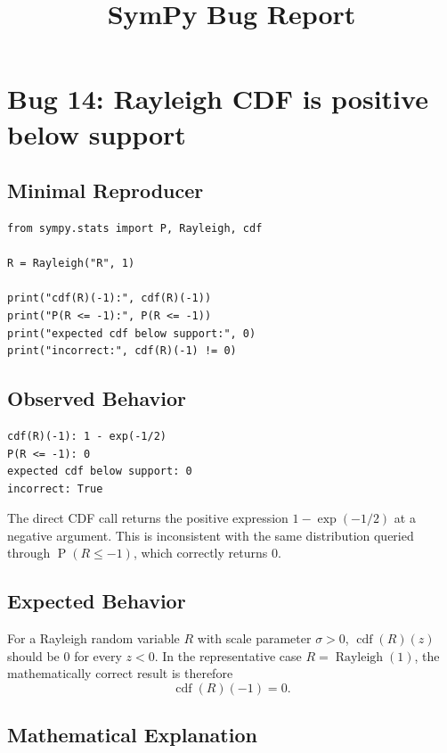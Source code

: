 \documentclass[11pt]{article}
\title{SymPy Bug Report}
\author{}
\date{}
\begin{document}
\maketitle

\section{Bug 14: Rayleigh CDF is positive below support}

\subsection{Minimal Reproducer}

\medskip

\begin{lstlisting}[style=bugpython]
from sympy.stats import P, Rayleigh, cdf

R = Rayleigh("R", 1)

print("cdf(R)(-1):", cdf(R)(-1))
print("P(R <= -1):", P(R <= -1))
print("expected cdf below support:", 0)
print("incorrect:", cdf(R)(-1) != 0)
\end{lstlisting}

\subsection{Observed Behavior}

\medskip

\begin{lstlisting}[style=bugpython]
cdf(R)(-1): 1 - exp(-1/2)
P(R <= -1): 0
expected cdf below support: 0
incorrect: True
\end{lstlisting}

The direct CDF call returns the positive expression \(1-\exp(-1/2)\) at a
negative argument.  This is inconsistent with the same distribution queried
through \(\operatorname{P}(R\leq -1)\), which correctly returns \(0\).

\subsection{Expected Behavior}

For a Rayleigh random variable \(R\) with scale parameter \(\sigma>0\),
\(\operatorname{cdf}(R)(z)\) should be \(0\) for every \(z<0\).  In the
representative case \(R=\operatorname{Rayleigh}(1)\), the mathematically correct
result is therefore
\[
  \operatorname{cdf}(R)(-1)=0.
\]

\subsection{Mathematical Explanation}
\end{document}
